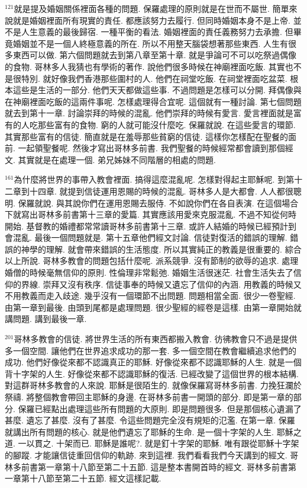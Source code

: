 \documentclass{book}
\begin{document}
$^{121}$就是提及婚姻關係裡面各種的問題.
保羅處理的原則就是在世而不屬世.
簡單來說就是婚姻裡面所有現實的責任.
都應該努力去履行.
但同時婚姻本身不是上帝.
並不是人生意義的最後歸宿.
一種平衡的看法.
婚姻裡面的責任義務努力去承擔.
但畢竟婚姻並不是一個人終極意義的所在.
所以不用整天腦袋想著那些東西.
人生有很多東西可以做.
第六個問題就去到第八章至第十章.
就是爭論可不可以吃祭過偶像的食物.
哥林多人我猜也有學術的著作.
說他們很多時候在神廟裡面吃飯.
其實也不是很特別.
就好像我們香港那些圍村的人.
他們在祠堂吃飯.
在祠堂裡面吃盆菜.
根本這些是生活的一部分.
他們天天都做這些事.
不過問題是怎樣可以分開.
拜偶像與在神廟裡面吃飯的這兩件事呢.
怎樣處理得合宜呢.
這個就有一種討論.
第七個問題就去到第十一章.
討論崇拜的時候的混亂.
他們崇拜的時候有愛言.
愛言裡面就是富有的人吃那些富有的食物.
窮的人就可能沒什麼吃.
保羅就說.
在這些愛言的環節.
其實那些富有的信徒.
簡直就是在羞辱那些貧窮的信徒.
這樣你怎樣配在聖餐的面前.
一起領聖餐呢.
然後才寫出哥林多前書.
我們聖餐的時候經常都會讀到那個經文.
其實就是在處理一個.
弟兄姊妹不同階層的相處的問題.

$^{161}$為什麼將世界的事帶入教會裡面.
搞得這麼混亂呢.
怎樣對得起主耶穌呢.
到第十二章到十四章.
就提到信徒運用恩賜的時候的混亂.
哥林多人是大都會.
人人都很聰明.
保羅就說.
與其說你們在運用恩賜去服侍.
不如說你們在各自表演.
在這個場合下就寫出哥林多前書第十三章的愛篇.
其實應該用愛來克服混亂.
不過不知從何時開始.
基督教的婚禮都常常讀哥林多前書第十三章.
或許人結婚的時候已經預計到會混亂.
最後一個問題就是.
第十五章他們經文討論.
信徒對復活的錯誤的理解.
錯誤的神學的理解.
就會帶來錯誤的生活態度.
所以其實純正的教義是很重要的.
綜合以上所說.
哥林多教會的問題包括什麼呢.
派系競爭.
沒有節制的欲辱的追求.
處理婚僧的時候毫無信仰的原則.
性倫理非常鬆弛.
婚姻生活很迷茫.
社會生活失去了信仰的界線.
崇拜又沒有秩序.
信徒事奉的時候又遺忘了信仰的內涵.
用教義的時候又不用教義而走入歧途.
幾乎沒有一個環節不出問題.
問題相當全面.
很少一卷聖經.
由第一章到最後.
由頭到尾都是處理問題.
很少聖經的經卷是這樣.
由第一章開始就講問題.
講到最後一章.

$^{201}$哥林多教會的信徒.
將世界生活的所有東西都搬入教會.
彷彿教會只不過是提供多一個空間.
讓他們在世界追求成功的那一套.
多一個空間在教會繼續追求他們的成功.
他們好像從來都不認識真正的耶穌.
好像從來都不認識耶穌的人生.
就是一個背十字架的人生.
好像從來都不認識耶穌的復活.
已經改變了這個世界的根本結構.
對這群哥林多教會的人來說.
耶穌是很陌生的.
就像保羅寫哥林多前書.
力挽狂瀾於祭禱.
將整個教會帶回主耶穌的身邊.
在哥林多前書一開頭的部分.
即是第一章的部分.
保羅已經點出處理這些所有問題的大原則.
即是問題很多.
但是那個核心遺漏了甚麼.
遺忘了甚麼.
沒有了甚麼.
令這些問題完全沒有規矩的氾濫.
在第一章.
保羅就講出所有問題的核心.
就是他們遺忘了耶穌的生命.
是一個十字架的人生.
耶穌之道.
一以貫之.
十架而已.
耶穌是誰呢?.
就是釘十字架的耶穌.
唯有跟從耶穌十字架的腳蹤.
才能讓信徒重回信仰的軌跡.
來到這裡.
我們看看我們今天講到的經文.
哥林多前書第一章第十八節至第二十五節.
這是整本書開首時的經文.
哥林多前書第一章第十八節至第二十五節.
經文這樣記載.
\end{document}

